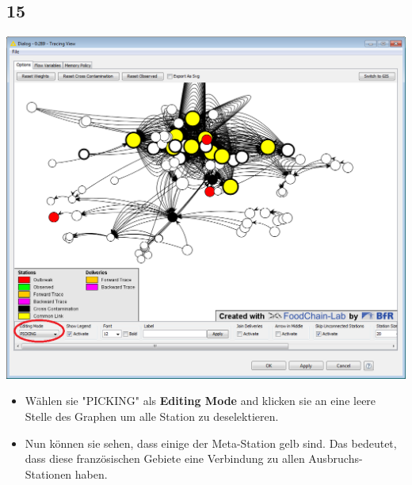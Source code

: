 \documentclass{beamer}
\begin{document}
\subsection{15}
\begin{frame}
	\begin{center}
  		\includegraphics[height=0.6\textheight]{15.png}
	\end{center}
	\begin{itemize}
		\item Wählen sie "PICKING" als \textbf{Editing Mode} and klicken sie an eine leere Stelle des Graphen um alle Station zu deselektieren.
		\item Nun können sie sehen, dass einige der Meta-Station gelb sind. Das bedeutet, dass diese französischen Gebiete eine Verbindung zu allen Ausbruchs-Stationen haben.
	\end{itemize}
\end{frame}
\end{document}
